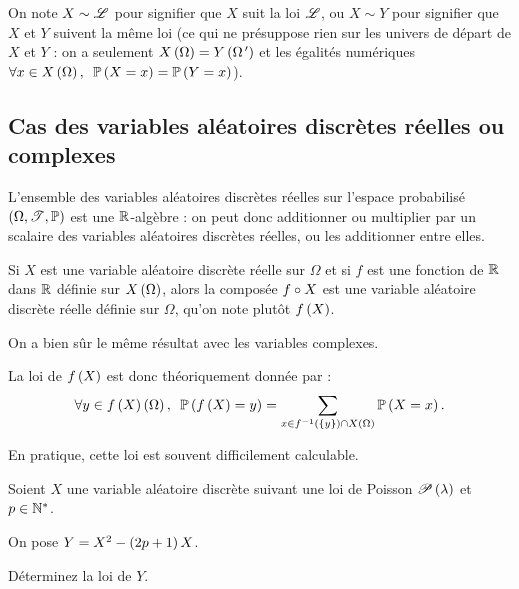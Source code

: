On note \(X\sim\mathscr{L}\) pour signifier que \(X\) suit la loi \(\mathscr{L}\), ou \(X\sim Y\) pour signifier que \(X\) et \(Y\) suivent la même loi (ce qui ne présuppose rien sur les univers de départ de \(X\) et \(Y\) : on a seulement \(X\left(\Omega\right)=Y\left(\Omega^{\,\prime}\right)\) et les égalités numériques \(\quantifs{\forall x\in X\paren{\Omega}}\proba{X=x}=\proba{Y=x}\)).

\subsection{Cas des variables aléatoires discrètes réelles ou complexes}

\begin{prop}
L'ensemble des variables aléatoires discrètes réelles sur l'espace probabilisé \(\anneau{\Omega}[\fami{T}][\prem]\) est une \(\mathbb{R}\)-algèbre : on peut donc additionner ou multiplier par un scalaire des variables aléatoires discrètes réelles, ou les additionner entre elles.

Si \(X\) est une variable aléatoire discrète réelle sur \(\Omega\) et si \(f\) est une fonction de \(\mathbb{R}\) dans \(\mathbb{R}\) définie sur \(X\left(\Omega\right)\), alors la composée \(f\circ X\) est une variable aléatoire discrète réelle définie sur \(\Omega\), qu'on note plutôt \(f\left(X\right)\).
\end{prop}

On a bien sûr le même résultat avec les variables complexes.

La loi de \(f\left(X\right)\) est donc théoriquement donnée par : \[\quantifs{\forall y\in f\paren{X}\paren{\Omega}}\proba{f\paren{X}=y}=\sum_{x\in f\inv\paren{\accol{y}}\inter X\paren{\Omega}}\proba{X=x}.\]

En pratique, cette loi est souvent difficilement calculable.

\begin{exo}
Soient \(X\) une variable aléatoire discrète suivant une loi de Poisson \(\mathscr{P}\left(\lambda\right)\) et \(p\in\mathbb{N}^*\).

On pose \(Y=X^2-\left(2p+1\right)X\).

Déterminez la loi de \(Y\).
\end{exo}

